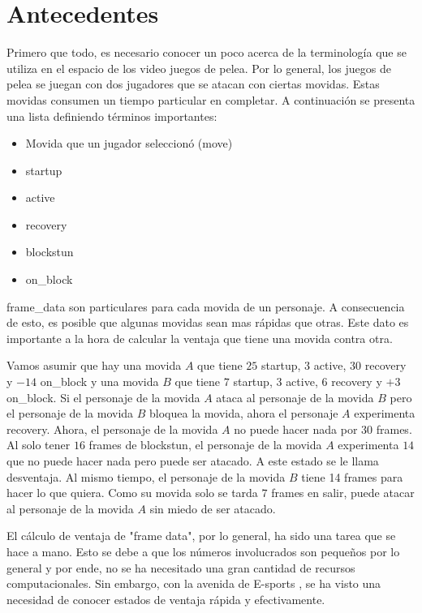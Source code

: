 \section{Antecedentes}

Primero que todo, es necesario conocer un poco acerca de la terminología que se utiliza en el espacio de los video juegos de pelea. Por lo general, los juegos de pelea se juegan con dos jugadores que se atacan con ciertas movidas. Estas movidas consumen un tiempo particular en completar. A continuación se presenta una lista definiendo términos importantes:
\begin{itemize}
    \item Movida que un jugador seleccionó (move)
    \item \gls{startup}
    \item \gls{active}
    \item \gls{recovery}
    \item \gls{blockstun}
    \item \gls{on_block}
\end{itemize}

\gls{frame_data} son particulares para cada movida de un personaje. A consecuencia de esto, es posible que algunas movidas sean mas rápidas que otras. Este dato es importante a la hora de calcular la ventaja que tiene una movida contra otra. 

Vamos asumir que hay una movida $A$ que tiene $25$ \gls{startup}, $3$ \gls{active}, $30$ \gls{recovery} y $-14$ \gls{on_block} y una movida $B$ que tiene $7$ \gls{startup}, $3$ \gls{active}, $6$ \gls{recovery} y $+3$ \gls{on_block}. Si el personaje de la movida $A$ ataca al personaje de la movida $B$ pero el personaje de la movida $B$ bloquea la movida, ahora el personaje $A$ experimenta \gls{recovery}. Ahora, el personaje de la movida $A$ no puede hacer nada por $30$ frames. Al solo tener $16$ frames de \gls{blockstun}, el personaje de la movida $A$ experimenta $14$ que no puede hacer nada pero puede ser atacado. A este estado se le llama desventaja. Al mismo tiempo, el personaje de la movida $B$ tiene 14 frames para hacer lo que quiera. Como su movida solo se tarda $7$ frames en salir, puede atacar al personaje de la movida $A$ sin miedo de ser atacado.

El cálculo de ventaja de "frame data", por lo general, ha sido una tarea que se hace a mano. Esto se debe a que los números involucrados son pequeños por lo general y por ende, no se ha necesitado una gran cantidad de recursos computacionales. Sin embargo, con la avenida de  E-sports \cite{willingham_what_2018}, se ha visto una necesidad de conocer estados de ventaja rápida y efectivamente.

